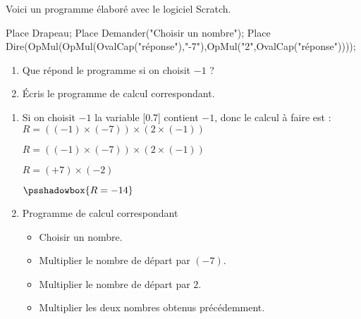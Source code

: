 \begin{exercice*}
    Voici un programme élaboré avec le logiciel Scratch.
    \begin{Scratch}[Echelle=0.75]
        Place Drapeau;
        Place Demander("Choisir un nombre");
        Place Dire(OpMul(OpMul(OvalCap("réponse"),"-7"),OpMul("2",OvalCap("réponse"))));
    \end{Scratch}
        \begin{enumerate}
            \item Que répond le programme si on choisit $-1$ ?
            \item Écris le programme de calcul correspondant.
        \end{enumerate}
\end{exercice*}
\begin{corrige}
    \phantom{rrr}    
        \begin{enumerate}
            \item Si on choisit $-1$ la variable
            \raisebox{-0.3\totalheight}[0.7\totalheight]{\raisebox{\depth}{
            \begin{Scratch}[Echelle=0.75]
                Place OvalCap("réponse");
            \end{Scratch}
            }}
            contient $-1$, donc le calcul à faire est : $ R = \left( (-1)\times (-7) \right)\times\left(2\times (-1)\right) $

            $ R = \left( (-1)\times (-7) \right)\times\left(2\times (-1)\right) $
            
            $ R = \left( +7 \right)\times\left(-2 \right) $

            $ \psshadowbox{R = -14} $
            \item  
            \begin{myProgCalculBox}{Programme de calcul correspondant}
                \begin{itemize}
                    \item Choisir un nombre.\hfill\phantom{.}
                    \item Multiplier le nombre de départ par $(-7)$.\hfill\phantom{.}
                    \item Multiplier le nombre de départ par $2$.\hfill\phantom{.}
                    \item Multiplier les deux nombres obtenus précédemment.\hfill\phantom{.}
                \end{itemize}
            \end{myProgCalculBox}

        \end{enumerate}
\end{corrige}